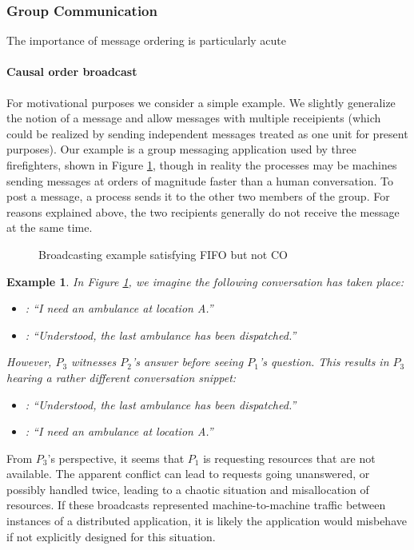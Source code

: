 \documentclass[]             %
{NASA}                       %
\newtheorem{example}{Example}
\theoremstyle{definition}
\begin{document}
\subsubsection{Group Communication}
The importance of message ordering is particularly acute

\paragraph{Causal order broadcast}
For motivational purposes we consider a simple example. We slightly
generalize the notion of a message and allow messages with multiple
receipients (which could be realized by sending independent messages
treated as one unit for present purposes). Our example is a group
messaging application used by three firefighters, shown in Figure
\ref{fig:message-latencies-c}, though in reality the processes may be
machines sending messages at orders of magnitude faster than a human
conversation. To post a message, a process sends it to the other two
members of the group. For reasons explained above, the two recipients
generally do not receive the message at the same time.

\begin{figure}
  \centering 
  \caption{Broadcasting example satisfying FIFO but not CO}
  \label{fig:message-latencies-c}
\end{figure}

\begin{example}
  \label{exmpl:ambulancedispatch}
  In Figure \ref{fig:message-latencies-c}, we imagine the following
  conversation has taken place:
  \begin{itemize}
\item [$P_1$]: ``I need an ambulance at location A.''
\item [$P_2$]: ``Understood, the last ambulance has been dispatched.''
\end{itemize}
However, $P_3$ witnesses $P_2$'s answer before seeing $P_1$'s
question. This results in $P_3$ hearing a rather different conversation snippet:
\begin{itemize}
\item [$P_2$]: ``Understood, the last ambulance has been dispatched.''
\item [$P_1$]: ``I need an ambulance at location A.''
\end{itemize}
\end{example}
From $P_3$'s perspective, it seems that $P_1$ is requesting resources
that are not available. The apparent conflict can lead to requests
going unanswered, or possibly handled twice, leading to a chaotic
situation and misallocation of resources. If these broadcasts
represented machine-to-machine traffic between instances of a
distributed application, it is likely the application would misbehave
if not explicitly designed for this situation.
\end{document}
